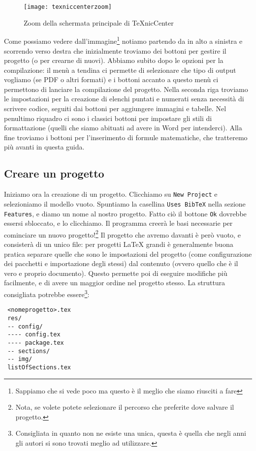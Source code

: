 \begin{figure}[H]
 \centering
 \texttt{[image: texniccenterzoom]}
 \caption{Zoom della schermata principale di TeXnicCenter}
 \label{img:principale_texcenter2}
\end{figure}


Come possiamo vedere dall'immagine\footnote{Sappiamo che si vede poco
ma questo è il meglio che siamo riusciti a fare} notiamo partendo da in alto
a sinistra e scorrendo verso destra che inizialmente troviamo dei bottoni per
gestire il progetto (o per crearne di nuovi).
Abbiamo subito dopo le opzioni per la compilazione: il menù a tendina ci
permette di selezionare che tipo di output vogliamo (se PDF o altri formati) e
i bottoni accanto a questo menù ci permettono di lanciare la compilazione
del progetto.
Nella seconda riga troviamo le impostazioni per la creazione di elenchi puntati
e numerati senza necessità di scrivere codice, seguiti dai bottoni per
aggiungere immagini e tabelle. Nel penultimo riquadro ci sono i classici bottoni
per impostare gli stili di formattazione (quelli che siamo abituati ad avere in
Word per intenderci).
Alla fine troviamo i bottoni per l'inserimento di formule matematiche, che
tratteremo più avanti in questa guida.

\subsection{Creare un progetto}

Iniziamo ora la creazione di un progetto.
Clicchiamo su \texttt{New Project} e selezioniamo il modello vuoto. Spuntiamo
la casellina \texttt{Uses BibTeX} nella sezione \texttt{Features}, e diamo un
nome al nostro progetto. Fatto ciò il bottone \texttt{Ok} dovrebbe essersi
sbloccato, e lo clicchiamo. Il programma creerà le basi necessarie per
cominciare un nuovo progetto!\footnote{Nota, se volete potete selezionare il
percorso che preferite dove salvare il progetto.}
Il progetto che avremo davanti è però vuoto, e consisterà di un unico file: per
progetti \LaTeX{} grandi è generalmente buona pratica separare quelle che sono
le impostazioni del progetto (come configurazione dei pacchetti e importazione
degli stessi) dal contenuto (ovvero quello che è il vero e proprio documento).
Questo permette poi di eseguire modifiche più facilmente, e di avere un maggior
ordine nel progetto stesso.
La struttura consigliata potrebbe essere\footnote{Consigliata in quanto non ne
esiste una unica, questa è quella che negli anni gli autori si sono trovati
meglio ad utilizzare.}:
\begin{verbatim}
 <nomeprogetto>.tex
 res/
 -- config/
 ---- config.tex
 ---- package.tex
 -- sections/
 -- img/
 listOfSections.tex
\end{verbatim}

